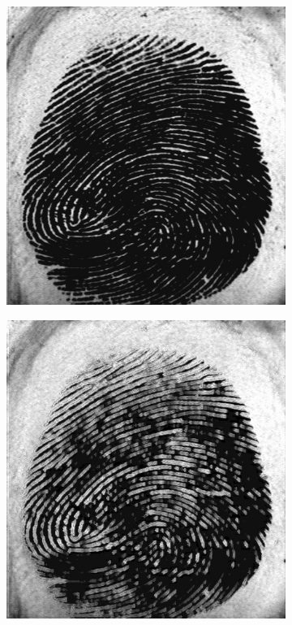 \documentclass{beamer}
\begin{document}
{\begin{figure}[!ht]
\begin{subfigure}[ht]{0.15\textwidth}
        \end{subfigure}
    \end{figure}
    \begin{figure}[!ht]
        \centering
        \begin{subfigure}[ht]{0.15\textwidth}
            \includegraphics[width=\textwidth]{fingerprints/2000Db3a/1_2_src.jpg}
        \end{subfigure}
        \qquad
        \begin{subfigure}[ht]{0.15\textwidth}
            \includegraphics[width=\textwidth]{fingerprints/2000Db3a/1_2_background.jpg}

\end{subfigure}
\end{figure}}
\end{document}
